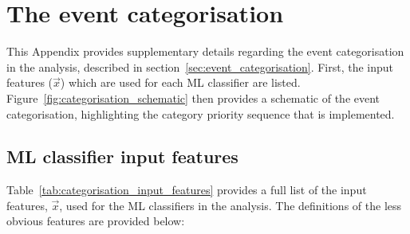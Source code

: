 \chapter{The \Hgg event categorisation}\label{app:event_categorisation}
\vspace{-.3cm}
This Appendix provides supplementary details regarding the event categorisation in the \Hgg analysis, described in section~\ref{sec:event_categorisation}. First, the input features ($\vec{x}$) which are used for each ML classifier are listed. Figure~\ref{fig:categorisation_schematic} then provides a schematic of the event categorisation, highlighting the category priority sequence that is implemented.

\section{ML classifier input features}
Table~\ref{tab:categorisation_input_features} provides a full list of the input features, $\vec{x}$, used for the ML classifiers in the \Hgg analysis. The definitions of the less obvious features are provided below:


